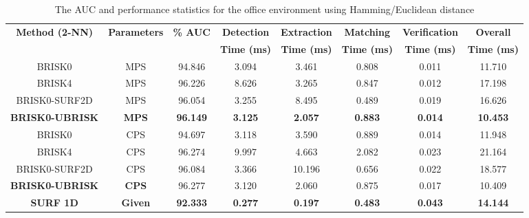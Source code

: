 \documentclass{report}
\begin{document}
\begin{table}
\caption{The AUC and performance statistics for the office environment using
Hamming/Euclidean distance}
\footnotesize
\begin{tabular}{|c|c|c|c|c|c|c|c|}
\hline 
\textbf{Method (2-NN)} & \textbf{Parameters} & \textbf{\% AUC} & \textbf{Detection} & \textbf{Extraction} & \textbf{Matching} & \textbf{Verification} & \textbf{Overall}\tabularnewline
 &  &  & \textbf{Time (ms)} & \textbf{Time (ms)} & \textbf{Time (ms)} & \textbf{Time (ms)} & \textbf{Time (ms)}\tabularnewline
\hline 
\hline 
BRISK0 & MPS & 94.846 & 3.094 & 3.461 & 0.808 & 0.011 & 11.710\tabularnewline
\hline 
BRISK4 & MPS & 96.226 & 8.626 & 3.265 & 0.847 & 0.012 & 17.198\tabularnewline
\hline 
BRISK0-SURF2D & MPS & 96.054 & 3.255 & 8.495 & 0.489 & 0.019 & 16.626\tabularnewline
\hline 
\textbf{BRISK0-UBRISK} & \textbf{MPS} & \textbf{96.149} & \textbf{3.125} & \textbf{2.057} & \textbf{0.883} & \textbf{0.014} & \textbf{10.453}\tabularnewline
\hline 
BRISK0 & CPS & 94.697 & 3.118 & 3.590 & 0.889 & 0.014 & 11.948\tabularnewline
\hline 
BRISK4 & CPS & 96.274 & 9.997 & 4.663 & 2.082 & 0.023 & 21.164\tabularnewline
\hline 
BRISK0-SURF2D & CPS & 96.084 & 3.366 & 10.196 & 0.656 & 0.022 & 18.577\tabularnewline
\hline 
\textbf{BRISK0-UBRISK} & \textbf{CPS} & 96.277 & 3.120 & 2.060 & 0.875 & 0.017 & 10.409\tabularnewline
\hline 
\textbf{SURF 1D} & \textbf{Given} & \textbf{92.333} & \textbf{0.277} & \textbf{0.197} & \textbf{0.483} & \textbf{0.043} & \textbf{14.144}\tabularnewline
\hline 
\end{tabular}
\label{tab:rocTimingOfficeHamming}
\end{table}
\end{document}
